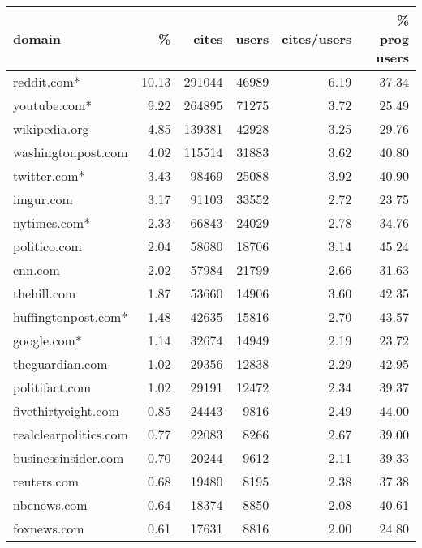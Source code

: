 \begin{tabular}{lrrrrr}
\toprule
domain & \% & cites & users & cites/users & \% prog users \\
\midrule
reddit.com*           &   10.13 &   291044 &   46989 &         6.19 &         37.34 \\
youtube.com*          &    9.22 &   264895 &   71275 &         3.72 &         25.49 \\
wikipedia.org         &    4.85 &   139381 &   42928 &         3.25 &         29.76 \\
washingtonpost.com    &    4.02 &   115514 &   31883 &         3.62 &         40.80 \\
twitter.com*          &    3.43 &    98469 &   25088 &         3.92 &         40.90 \\
imgur.com             &    3.17 &    91103 &   33552 &         2.72 &         23.75 \\
nytimes.com*          &    2.33 &    66843 &   24029 &         2.78 &         34.76 \\
politico.com          &    2.04 &    58680 &   18706 &         3.14 &         45.24 \\
cnn.com               &    2.02 &    57984 &   21799 &         2.66 &         31.63 \\
thehill.com           &    1.87 &    53660 &   14906 &         3.60 &         42.35 \\
huffingtonpost.com*   &    1.48 &    42635 &   15816 &         2.70 &         43.57 \\
google.com*           &    1.14 &    32674 &   14949 &         2.19 &         23.72 \\
theguardian.com       &    1.02 &    29356 &   12838 &         2.29 &         42.95 \\
politifact.com        &    1.02 &    29191 &   12472 &         2.34 &         39.37 \\
fivethirtyeight.com   &    0.85 &    24443 &    9816 &         2.49 &         44.00 \\
realclearpolitics.com &    0.77 &    22083 &    8266 &         2.67 &         39.00 \\
businessinsider.com   &    0.70 &    20244 &    9612 &         2.11 &         39.33 \\
reuters.com           &    0.68 &    19480 &    8195 &         2.38 &         37.38 \\
nbcnews.com           &    0.64 &    18374 &    8850 &         2.08 &         40.61 \\
foxnews.com           &    0.61 &    17631 &    8816 &         2.00 &         24.80 \\

\end{tabular}
